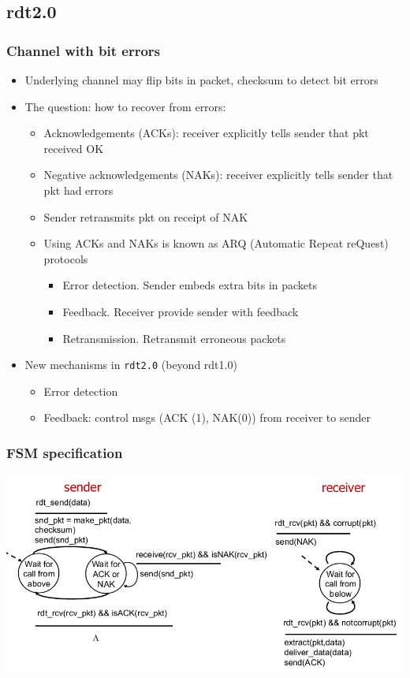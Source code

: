 \documentclass{article}[18pt]
\begin{document}
\subsection{rdt2.0}
\subsubsection{Channel with bit errors}
\begin{itemize}
	\item Underlying channel may flip bits in packet, checksum to detect bit errors
	\item The question: how to recover from errors:
	\begin{itemize}
		\item Acknowledgements (ACKs): receiver explicitly tells sender that pkt received OK
		\item Negative acknowledgements (NAKs): receiver explicitly tells sender that pkt had errors
		\item Sender retransmits pkt on receipt of NAK
		\item Using ACKs and NAKs is known as ARQ (Automatic Repeat reQuest) protocols
		\begin{itemize}
			\item Error detection. Sender embeds extra bits in packets
			\item Feedback. Receiver provide sender with feedback
			\item Retransmission. Retransmit erroneous packets
		\end{itemize}
	\end{itemize}
	\item New mechanisms in \texttt{rdt2.0} (beyond rdt1.0)
	\begin{itemize}
		\item Error detection
		\item Feedback: control msgs (ACK (1), NAK(0)) from receiver to sender
	\end{itemize}
\end{itemize}
\subsubsection{FSM specification}
\begin{center}
	\includegraphics[scale=0.7]{FSM}
\end{center}
\end{document}
